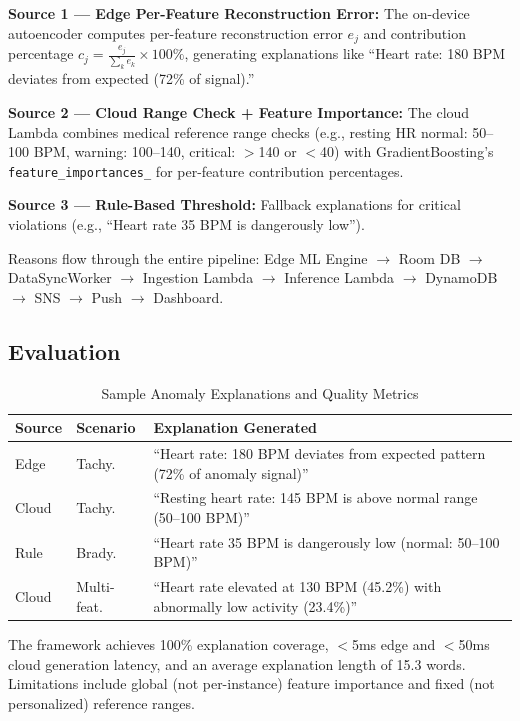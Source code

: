 \documentclass[conference]{IEEEtran}
\begin{document}
\textbf{Source 1 --- Edge Per-Feature Reconstruction Error:} The on-device autoencoder computes per-feature reconstruction error $e_j$ and contribution percentage $c_j = \frac{e_j}{\sum_{k} e_k} \times 100\%$, generating explanations like ``Heart rate: 180 BPM deviates from expected (72\% of signal).''

\textbf{Source 2 --- Cloud Range Check + Feature Importance:} The cloud Lambda combines medical reference range checks (e.g., resting HR normal: 50--100 BPM, warning: 100--140, critical: $>$140 or $<$40) with GradientBoosting's \texttt{feature\_importances\_} for per-feature contribution percentages.

\textbf{Source 3 --- Rule-Based Threshold:} Fallback explanations for critical violations (e.g., ``Heart rate 35 BPM is dangerously low'').

Reasons flow through the entire pipeline: Edge ML Engine $\rightarrow$ Room DB $\rightarrow$ DataSyncWorker $\rightarrow$ Ingestion Lambda $\rightarrow$ Inference Lambda $\rightarrow$ DynamoDB $\rightarrow$ SNS $\rightarrow$ Push $\rightarrow$ Dashboard.

\subsection{Evaluation}

\begin{table}[H]
\centering
\caption{Sample Anomaly Explanations and Quality Metrics}
\label{tab:examples}
\begin{tabular}{p{1.2cm}p{1.5cm}p{4.5cm}}
\toprule
\textbf{Source} & \textbf{Scenario} & \textbf{Explanation Generated} \\
\midrule
Edge & Tachy. & ``Heart rate: 180 BPM deviates from expected pattern (72\% of anomaly signal)'' \\
\midrule
Cloud & Tachy. & ``Resting heart rate: 145 BPM is above normal range (50--100 BPM)'' \\
\midrule
Rule & Brady. & ``Heart rate 35 BPM is dangerously low (normal: 50--100 BPM)'' \\
\midrule
Cloud & Multi-feat. & ``Heart rate elevated at 130 BPM (45.2\%) with abnormally low activity (23.4\%)'' \\
\bottomrule
\end{tabular}
\end{table}

The framework achieves 100\% explanation coverage, $<$5ms edge and $<$50ms cloud generation latency, and an average explanation length of 15.3 words. Limitations include global (not per-instance) feature importance and fixed (not personalized) reference ranges.
\end{document}
